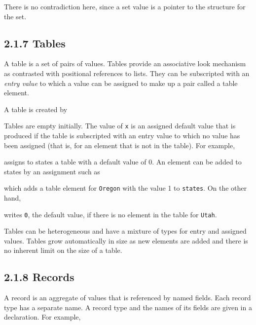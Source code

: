 There is no contradiction here, since a set value is a pointer to the
structure for the set.


\subsection[2.1.7 Tables]{2.1.7 Tables}

A table is a set of pairs of values. Tables provide an associative
look mechanism as contrasted with positional references to lists. They
can be subscripted with an \textit{entry value }to which a value can
be assigned to make up a pair called a table element.

A table is created by


Tables are empty initially. The value of \texttt{x} is an assigned default
value that is produced if the table is subscripted with an entry value
to which no value has been assigned (that is, for an element that is
not in the table). For example,


\noindent assigns to states a table with a default value of 0. An
element can be added to states by an assignment such as


\noindent which adds a table element for
\texttt{{\textquotedbl}Oregon{\textquotedbl}} with the value 1 to
\texttt{states}. On the other hand,


\noindent writes \texttt{0}, the default value, if there is no element
in the table for \texttt{{\textquotedbl}Utah{\textquotedbl}}.

Tables can be heterogeneous and have a mixture of types for entry and
assigned values. Tables grow automatically in size as new elements are
added and there is no inherent limit on the size of a table.


\subsection[2.1.8 Records]{2.1.8 Records}

A record is an aggregate of values that is referenced by named
fields. Each record type has a separate name. A record type and the
names of its fields are given in a declaration. For example,



